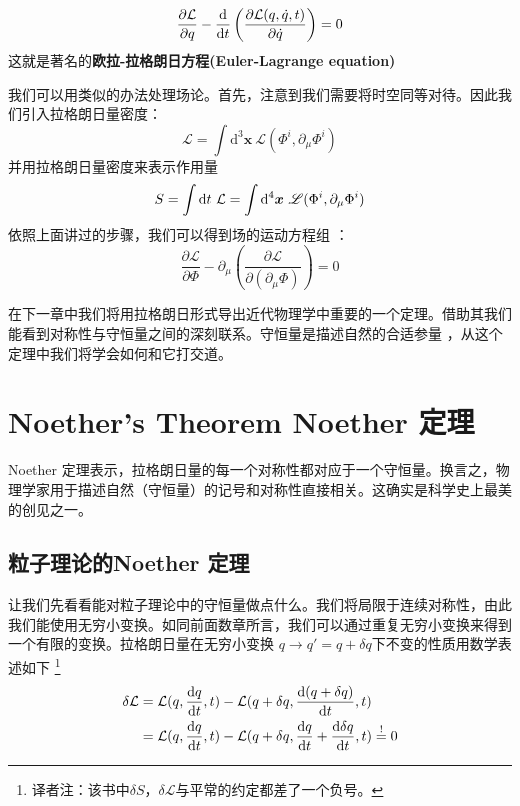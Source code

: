 \begin{equation}
\frac{\partial \mathcal{L}}{\partial q} - \frac{\mathrm d}{\mathrm d t} \left( \frac{\partial \mathcal{L}(q,\dot q,t)}{\partial \dot q} \right)= 0
\label{eq:4.7}
\end{equation}
这就是著名的{\bf 欧拉-拉格朗日方程(Euler-Lagrange equation)}

我们可以用类似的办法处理场论。首先，注意到我们需要将时空同等对待。因此我们引入拉格朗日量密度：
\begin{equation}
{\mathcal L} = \int{\mathrm d}^3\bm{x}~{\mathscr L}(\Phi^i,\partial_\mu \Phi^i) 
\end{equation}
并用拉格朗日量密度来表示作用量
\begin{equation}
S = \int \mathrm d t~{\mathcal L} = \int{\mathrm d}^4\bm{x}~{\mathscr L}(\Phi^i,\partial_\mu \Phi^i) 
\end{equation}
依照上面讲过的步骤，我们可以得到场的运动方程组%
%
：
\begin{equation}
\frac{\partial \mathcal{L}}{\partial \Phi} - \partial_\mu \left( \frac{\partial \mathcal{L}}{\partial (\partial_\mu \Phi)} \right)= 0
\end{equation}

在下一章中我们将用拉格朗日形式导出近代物理学中重要的一个定理。借助其我们能看到对称性与守恒量之间的深刻联系。守恒量是描述自然的合适参量%
%
，从这个定理中我们将学会如何和它打交道。

\section[Noether 定理]{Noether's Theorem \quad Noether 定理}\label{sec4.5}
Noether 定理表示，拉格朗日量的每一个对称性都对应于一个守恒量。换言之，物理学家用于描述自然（守恒量）的记号和对称性直接相关。这确实是科学史上最美的创见之一。

\subsection{粒子理论的Noether 定理}\label{sec4.5.1}
让我们先看看能对粒子理论中的守恒量做点什么。我们将局限于连续对称性，由此我们能使用无穷小变换。如同前面数章所言，我们可以通过重复无穷小变换来得到一个有限的变换。拉格朗日量在无穷小变换%
%
\(q\rightarrow q'=q+\delta q\)下不变的性质用数学表述如下%
\footnote{译者注：该书中$\delta S$，$\delta {\mathcal L}$与平常的约定都差了一个负号。}
\begin{equation}
\begin{aligned}
\delta {\mathcal L} &= {\mathcal L}(q,\frac{\mathrm d q}{\mathrm d t},t) - {\mathcal L}(q+\delta q,\frac{\mathrm d (q+\delta q)}{\mathrm d t},t) \\
&= {\mathcal L}(q,\frac{\mathrm d q}{\mathrm d t},t) - {\mathcal L}(q+\delta q,\frac{\mathrm d q}{\mathrm d t}+\frac{\mathrm d \delta q}{\mathrm d t},t) \overset{\text{!}}{=} 0 
\end{aligned}
\label{eq:4.11}
\end{equation}

